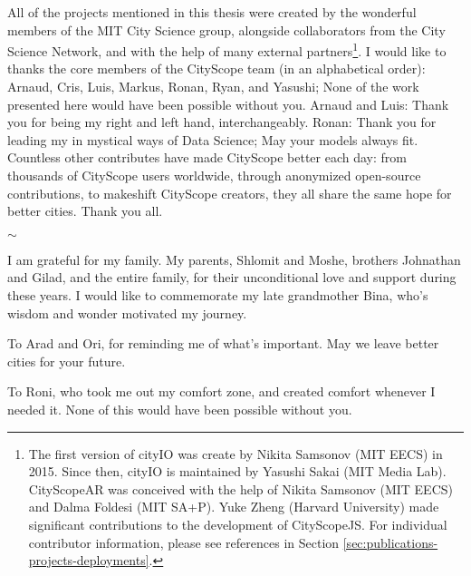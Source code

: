 {  All of the projects mentioned in this thesis were created by the wonderful members of the MIT City Science group, alongside collaborators from the City Science Network, and with the help of many external partners\footnote{The first version of cityIO was create by Nikita Samsonov (MIT EECS) in 2015. Since then, cityIO is maintained by Yasushi Sakai (MIT Media Lab). CityScopeAR was conceived with the help of Nikita Samsonov (MIT EECS) and Dalma Foldesi (MIT SA+P). Yuke Zheng (Harvard University) made significant contributions to the development of CityScopeJS. For individual contributor information, please see references in Section \eqref{sec:publications-projects-deployments}.}. I would like to thanks the core members of the CityScope team (in an alphabetical order): Arnaud, Cris, Luis, Markus, Ronan, Ryan, and Yasushi; None of the work presented here would have been possible without you. Arnaud and Luis: Thank you for being my right and left hand, interchangeably. Ronan: Thank you for leading my in mystical ways of Data Science; May your models always fit. Countless other contributes have made CityScope better each day: from thousands of CityScope users worldwide, through anonymized open-source contributions, to makeshift CityScope creators, they all share the same hope for better cities. Thank you all.

  \bigskip
  \begin{center}
      $\sim$
  \end{center}
  \bigskip

  I am grateful for my family. My parents, Shlomit and Moshe, brothers Johnathan and Gilad, and the entire family, for their unconditional love and support during these years. I would like to commemorate my late grandmother Bina, who's wisdom and wonder motivated my journey.

  \bigskip

  To Arad and Ori, for reminding me of what's important. May we leave better cities for your future.

  \bigskip
  To Roni, who took me out my comfort zone, and created comfort whenever I needed it. None of this would have been possible without you.
 }
